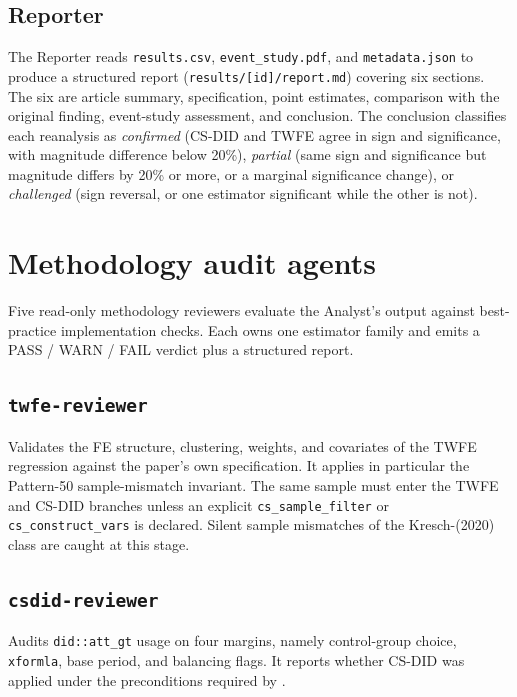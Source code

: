 \subsection*{Reporter}

The Reporter reads \texttt{results.csv}, \texttt{event\_study.pdf}, and \texttt{metadata.json} to produce a structured report (\texttt{results/[id]/report.md}) covering six sections. The six are article summary, specification, point estimates, comparison with the original finding, event-study assessment, and conclusion. The conclusion classifies each reanalysis as \emph{confirmed} (CS-DID and TWFE agree in sign and significance, with magnitude difference below 20\%), \emph{partial} (same sign and significance but magnitude differs by 20\% or more, or a marginal significance change), or \emph{challenged} (sign reversal, or one estimator significant while the other is not).


\section{Methodology audit agents}
\label{sec:appc_reviewers}

Five read-only methodology reviewers evaluate the Analyst's output against best-practice implementation checks. Each owns one estimator family and emits a PASS / WARN / FAIL verdict plus a structured report.

\subsection*{\texttt{twfe-reviewer}}

Validates the FE structure, clustering, weights, and covariates of the TWFE regression against the paper's own specification. It applies in particular the Pattern-50 sample-mismatch invariant. The same sample must enter the TWFE and CS-DID branches unless an explicit \texttt{cs\_sample\_filter} or \texttt{cs\_construct\_vars} is declared. Silent sample mismatches of the Kresch-(2020) class are caught at this stage.

\subsection*{\texttt{csdid-reviewer}}

Audits \texttt{did::att\_gt} usage on four margins, namely control-group choice, \texttt{xformla}, base period, and balancing flags. It reports whether CS-DID was applied under the preconditions required by \textcite{callaway2021difference}.

